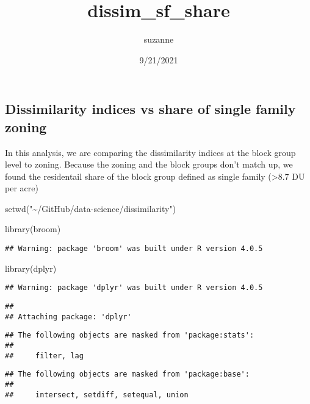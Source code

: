 \documentclass[
]{article}
\title{dissim\_sf\_share}
\author{suzanne}
\date{9/21/2021}
\newenvironment{Shaded}{\begin{snugshade}}{\end{snugshade}}
\newcommand{\FunctionTok}[1]{\textcolor[rgb]{0.00,0.00,0.00}{#1}}
\newcommand{\NormalTok}[1]{#1}
\newcommand{\StringTok}[1]{\textcolor[rgb]{0.31,0.60,0.02}{#1}}
\begin{document}
\maketitle

\hypertarget{dissimilarity-indices-vs-share-of-single-family-zoning}{%
\subsection{Dissimilarity indices vs share of single family
zoning}\label{dissimilarity-indices-vs-share-of-single-family-zoning}}

In this analysis, we are comparing the dissimilarity indices at the
block group level to zoning. Because the zoning and the block groups
don't match up, we found the residentail share of the block group
defined as single family (\textgreater8.7 DU per acre)

\begin{Shaded}
\begin{Highlighting}[]
\FunctionTok{setwd}\NormalTok{(}\StringTok{"\textasciitilde{}/GitHub/data{-}science/dissimilarity"}\NormalTok{)}

\FunctionTok{library}\NormalTok{(broom)}
\end{Highlighting}
\end{Shaded}

\begin{verbatim}
## Warning: package 'broom' was built under R version 4.0.5
\end{verbatim}

\begin{Shaded}
\begin{Highlighting}[]
\FunctionTok{library}\NormalTok{(dplyr)}
\end{Highlighting}
\end{Shaded}

\begin{verbatim}
## Warning: package 'dplyr' was built under R version 4.0.5
\end{verbatim}

\begin{verbatim}
## 
## Attaching package: 'dplyr'
\end{verbatim}

\begin{verbatim}
## The following objects are masked from 'package:stats':
## 
##     filter, lag
\end{verbatim}

\begin{verbatim}
## The following objects are masked from 'package:base':
## 
##     intersect, setdiff, setequal, union
\end{verbatim}
\end{document}

